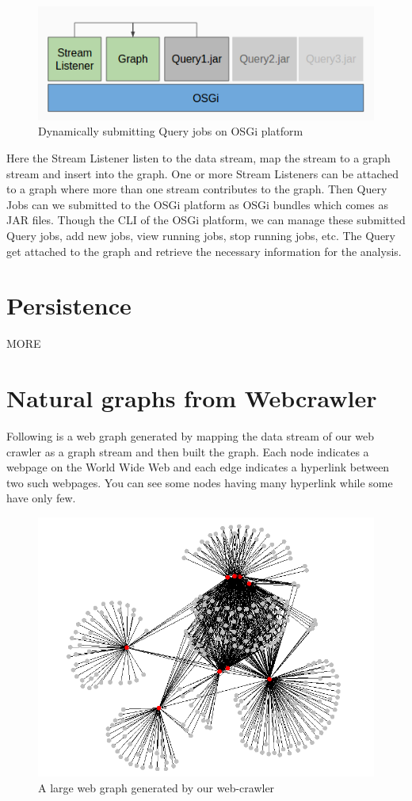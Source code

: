 \documentclass[12pt]{report}
\numberwithin{figure}{section}
\numberwithin{table}{section}
\begin{document}
\begin{figure}[H]
\centering
\includegraphics[scale=0.6]{images/OSGi}
\caption{Dynamically submitting Query jobs on OSGi platform}
\end{figure}

Here the Stream Listener listen to the data stream, map the stream to a graph stream and insert into the graph. One or more Stream Listeners can be attached to a graph where more than one stream contributes to the graph. Then Query Jobs can we submitted to the OSGi platform as OSGi bundles which comes as JAR files. Though the CLI of the OSGi platform, we can manage these submitted Query jobs, add new jobs, view running jobs, stop running jobs, etc. The Query get attached to the graph and retrieve the necessary information for the analysis. 
\section{Persistence}

MORE

\section{Natural graphs from Webcrawler}
Following is a web graph generated by mapping the data stream of our web crawler as a graph stream and then built the graph. Each node indicates a webpage on the World Wide Web and each edge indicates a hyperlink between two such webpages. You can see some nodes having many hyperlink while some have only few. 

\begin{figure}[H]
\centering
\includegraphics[scale=0.6]{images/web-graph}
\caption{A large web graph generated by our web-crawler}
\end{figure}
\end{document}
